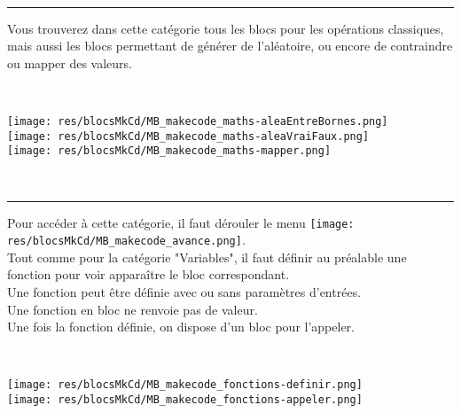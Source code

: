 \begin{minipage}[t]{0.75\linewidth}

    \begin{blocMaths}\\
      \rule{-0.25em}{2em}
      Vous trouverez dans cette catégorie tous les blocs pour les opérations classiques, mais aussi les blocs permettant de générer de l'aléatoire, ou encore de contraindre ou mapper des valeurs.


    \end{blocMaths}

\end{minipage}
\hfill
\begin{minipage}[t]{0.25\linewidth}~\\
  \vspace{5mm}

    \texttt{[image: res/blocsMkCd/MB\_makecode\_maths-aleaEntreBornes.png]}\\[0.5em]
    \texttt{[image: res/blocsMkCd/MB\_makecode\_maths-aleaVraiFaux.png]}\\[0.5em]
    \texttt{[image: res/blocsMkCd/MB\_makecode\_maths-mapper.png]}\\[0.5em]


\end{minipage}

\begin{minipage}[t]{0.75\linewidth}

    \begin{blocFonctions}\\
      \rule{-0.25em}{2em}
      Pour accéder à cette catégorie, il faut dérouler le menu \texttt{[image: res/blocsMkCd/MB\_makecode\_avance.png]}.\\
      Tout comme pour la catégorie "Variables", il faut définir au préalable une fonction pour voir apparaître le bloc correspondant.\\
      \vspace{5mm}
      Une fonction peut être définie avec ou sans paramètres d'entrées.\\
      Une fonction en bloc ne renvoie pas de valeur.\\
      Une fois la fonction définie, on dispose d'un bloc pour l'appeler.


    \end{blocFonctions}

\end{minipage}
\hfill
\begin{minipage}[t]{0.25\linewidth}~\\
  \vspace{5mm}

    \texttt{[image: res/blocsMkCd/MB\_makecode\_fonctions-definir.png]}\\[0.5em]
    \texttt{[image: res/blocsMkCd/MB\_makecode\_fonctions-appeler.png]}\\[0.5em]


\end{minipage}
